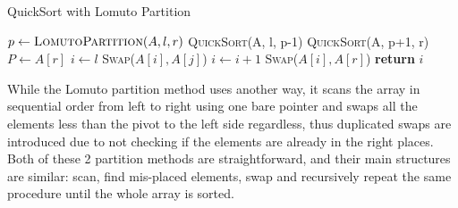 \documentclass{article}
\begin{document}
\begin{algorithm}[H]
    \caption{QuickSort with Lomuto Partition}\label{LomutoPartition}
    \begin{algorithmic}[1]
        \State $p \gets \textsc{LomutoPartition}(A, l, r)$
        \State \textsc{QuickSort}(A, l, p-1)
        \State \textsc{QuickSort}(A, p+1, r)
        \EndIf
        \EndProcedure
        \State $P \gets A[r]$ 
        \State $i \gets l$
        \State \textsc{Swap}($A[i], A[j]$)
        \State $i \gets i + 1$
        \EndIf
        \EndFor
        \State \textsc{Swap}($A[i], A[r]$) 
        \State \textbf{return} $i$
        \EndProcedure
    \end{algorithmic}
\end{algorithm}

While the Lomuto partition method uses another way, it scans the array in sequential order from left to right using one bare pointer
and swaps all the elements less than the pivot to the left side regardless,
thus duplicated swaps are introduced due to not checking if the elements are already in the right places. Both of these 2 partition methods are straightforward, 
and their main structures are similar: scan, find mis-placed elements, swap and recursively repeat the same procedure until the whole array is sorted.
\end{document}
